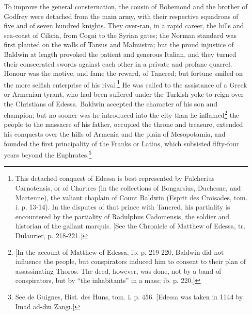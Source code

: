 To improve the general consternation, the cousin of Bohemond and the brother of Godfrey were detached from the main army, with their respective squadrons of five and of seven hundred knights. They over-ran, in a rapid career, the hills and sea-coast of Cilicia, from Cogni to the Syrian gates; the Norman standard was first planted on the walls of Tarsus and Malmistra; but the proud injustice of Baldwin at length provoked the patient and generous Italian, and they turned their consecrated swords against each other in a private and profane quarrel. Honour was the motive, and fame the reward, of Tancred; but fortune smiled on the more selfish enterprise of his rival.\footnote{This detached conquest of Edessa is best represented by Fulcherius Carnotensis, or of Chartres (in the collections of Bongarsius, Duchesne, and Martenne), the valiant chaplain of Count Baldwin (Esprit des Croisades, tom. i. p. 13-14). In the disputes of that prince with Tancred, his partiality is encountered by the partiality of Radulphus Cadomensis, the soldier and historian of the gallant marquis. [See the Chronicle of Matthew of Edessa, tr. Dulaurier, p. 218-221.]} He was called to the assistance of a Greek or Armenian tyrant, who had been suffered under the Turkish yoke to reign over the Christians of Edessa. Baldwin accepted the character of his son and champion; but no sooner was he introduced into the city than he inflamed\footnote{[In the account of Matthew of Edessa, ib. p. 219-220, Baldwin did not influence the people, but conspirators induced him to consent to their plan of assassinating Thoros. The deed, however, was done, not by a band of conspirators, but by \texthebrew{“}the inhabitants\texthebrew{}” in a mass; ib. p. 220.]} the people to the massacre of his father, occupied the throne and treasure, extended his conquests over the hills of Armenia and the plain of Mesopotamia, and founded the first principality of the Franks or Latins, which subsisted fifty-four years beyond the Euphrates.\footnote{See de Guignes, Hist. des Huns, tom. i. p. 456. [Edessa was taken in 1144 by Imād ad-dīn Zangī.]}

